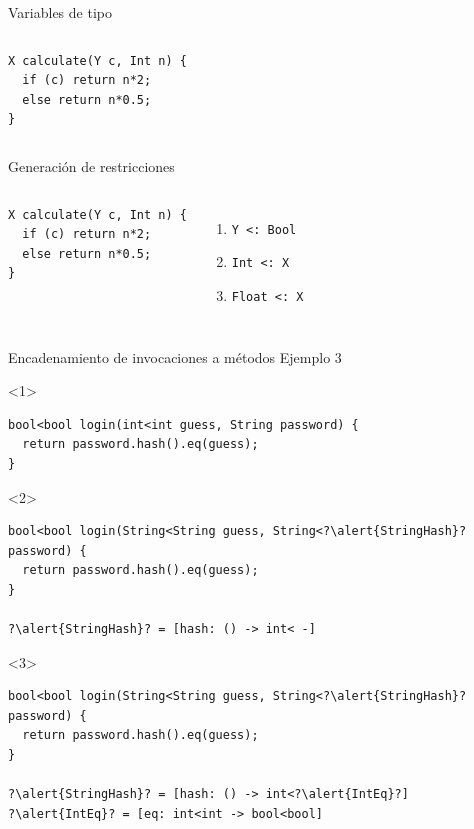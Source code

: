 \documentclass[aspectratio=169,18pt]{beamer}
\begin{document}
\begin{frame}[fragile]{Variables de tipo}
	\begin{columns}[T,onlytextwidth]
\begin{lstlisting}[basicstyle=\fontsize{10}{10}\ttfamily]
X calculate(Y c, Int n) {
  if (c) return n*2;
  else return n*0.5;
}
\end{lstlisting}
\end{columns}
\end{frame}

\begin{frame}[fragile]{Generación de restricciones}
	\begin{columns}[T,onlytextwidth]
\begin{lstlisting}[basicstyle=\fontsize{10}{10}\ttfamily]
X calculate(Y c, Int n) {
  if (c) return n*2;
  else return n*0.5;
}
\end{lstlisting}
		\begin{enumerate}
			\item \texttt{Y <: Bool}
			\item \texttt{Int <: X}
			\item \texttt{Float <: X}
		\end{enumerate}
	\end{columns}
\end{frame}

\begin{frame}[fragile]{Encadenamiento de invocaciones a métodos}
	Ejemplo 3 \\
	\vspace{1cm}
	\begin{onlyenv}
\begin{lstlisting}[escapechar=?,basicstyle=\fontsize{10}{10}\ttfamily]
bool<bool login(int<int guess, String password) {
  return password.hash().eq(guess);
}
\end{lstlisting}
	\end{onlyenv}
	\begin{onlyenv}
\begin{lstlisting}[escapechar=?,basicstyle=\fontsize{10}{10}\ttfamily]
bool<bool login(String<String guess, String<?\alert{StringHash}? password) {
  return password.hash().eq(guess);
}

?\alert{StringHash}? = [hash: () -> int< -]
\end{lstlisting}
	\end{onlyenv}
	\begin{onlyenv}
\begin{lstlisting}[escapechar=?,basicstyle=\fontsize{10}{10}\ttfamily]
bool<bool login(String<String guess, String<?\alert{StringHash}? password) {
  return password.hash().eq(guess);
}

?\alert{StringHash}? = [hash: () -> int<?\alert{IntEq}?]
?\alert{IntEq}? = [eq: int<int -> bool<bool]
\end{lstlisting}
	\end{onlyenv}
\end{frame}
\end{document}
